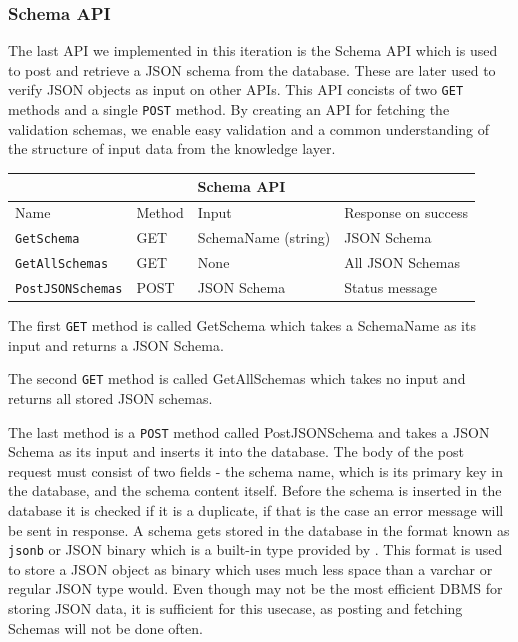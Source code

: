 \subsubsection{Schema API}
The last API we implemented in this iteration is the Schema API which is used to post and retrieve a JSON schema from the database. These are later used to verify JSON objects as input on other APIs. 
This API concists of two \texttt{GET} methods and a single \texttt{POST} method.
By creating an API for fetching the validation schemas, we enable easy validation and a common understanding of the structure of input data from the knowledge layer.
\begin{table}[h]
    \begin{tabular}{|llll|}
    \hline
    \multicolumn{4}{|c|}{\textbf{Schema API}}                                                                                                     \\ \hline
    \multicolumn{1}{|l|}{Name}                     & \multicolumn{1}{l|}{Method} & \multicolumn{1}{l|}{Input}               & Response on success \\ \hline
    \multicolumn{1}{|l|}{\texttt{GetSchema}}       & \multicolumn{1}{l|}{GET}    & \multicolumn{1}{l|}{SchemaName (string)} & JSON Schema         \\ \hline
    \multicolumn{1}{|l|}{\texttt{GetAllSchemas}}   & \multicolumn{1}{l|}{GET}    & \multicolumn{1}{l|}{None}                & All JSON Schemas    \\ \hline
    \multicolumn{1}{|l|}{\texttt{PostJSONSchemas}} & \multicolumn{1}{l|}{POST}   & \multicolumn{1}{l|}{JSON Schema}         & Status message      \\ \hline
    \end{tabular}
    \end{table}

The first \texttt{GET} method is called GetSchema which takes a SchemaName as its input and returns a JSON Schema. 

The second \texttt{GET} method is called GetAllSchemas which takes no input and returns all stored JSON schemas. 

The last method is a \texttt{POST} method called PostJSONSchema and takes a JSON Schema as its input and inserts it into the database.
The body of the post request must consist of two fields - the schema name, which is its primary key in the database, and the schema content itself. Before the schema is inserted in the database it is checked if it is a duplicate, if that is the case an error message will be sent in response.
A schema gets stored in the database in the format known as \texttt{jsonb} or JSON binary which is a built-in type provided by \postgres{}.
This format is used to store a JSON object as binary which uses much less space than a varchar or regular JSON type would.
Even though \postgres{} may not be the most efficient DBMS for storing JSON data, it is sufficient for this usecase, as posting and fetching Schemas will not be done often.




